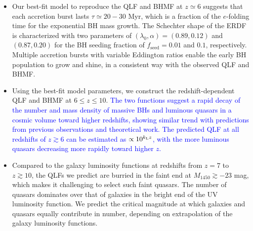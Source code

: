 \documentclass[twocolumn, twocolappendix]{aastex63}
\newcommand{\fseed}{f_\mathrm{seed}}
\newcommand{\Muv}{M_{1450}}
\newcommand{\red}[1]{\textcolor{red}{ #1}}
\newcommand{\blue}[1]{\textcolor{blue}{ #1}}
\begin{document}
\begin{CJK*}{UTF8}{gbsn}
\begin{itemize}
\item
Our best-fit model to reproduce the QLF and BHMF at $z\simeq 6$ suggests that each accretion burst
lasts $\tau \simeq 20-30$ Myr, which is a fraction of the $e$-folding time for the exponential BH mass growth.
The Schechter shape of the ERDF is characterized with two parameters of 
$(\lambda_0, \alpha)=(0.89,0.12)$ and $(0.87,0.20)$ for the BH seeding fraction of $\fseed = 0.01$ and $0.1$, respectively.
Multiple accretion bursts with variable Eddington ratios enable the early BH population to grow and shine,
in a consistent way with the observed QLF and BHMF.


\item
Using the best-fit model parameters, we construct the redshift-dependent QLF and BHMF at $6\leq z \leq 10$.
\blue{The two functions suggest a rapid decay of the number and mass density of massive BHs and luminous quasars
in a cosmic volume toward higher redshifts,
showing similar trend with predictions from previous observations and theoretical work.
The predicted QLF at all redshifts of $z\gtrsim 6$ can be estimated as $\propto 10^{k_{\rm L} z}$,
with the more luminous quasars decreasing more rapidly toward higher $z$.
}

\item
Compared to the galaxy luminosity functions at redshifts from $z=7$ to $z\gtrsim 10$,
the QLFs we predict are burried in the faint end at $\Muv \gtrsim -23$ mag,
which makes it challenging to select such faint quasars.
The number of quasars dominates over that of galaxies in the bright end of the UV luminosity function.
We predict the critical magnitude at which galaxies and quasars equally contribute in number,
depending on extrapolation of the galaxy luminosity functions.



\end{itemize}
\end{CJK*}
\end{document}

